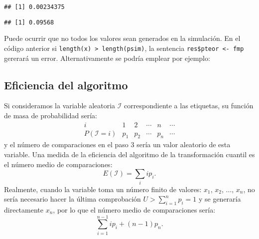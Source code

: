\documentclass[
]{book}
\newenvironment{Shaded}{\begin{snugshade}}{\end{snugshade}}
\newcommand{\DataTypeTok}[1]{\textcolor[rgb]{0.13,0.29,0.53}{#1}}
\newcommand{\DecValTok}[1]{\textcolor[rgb]{0.00,0.00,0.81}{#1}}
\newcommand{\KeywordTok}[1]{\textcolor[rgb]{0.13,0.29,0.53}{\textbf{#1}}}
\newcommand{\NormalTok}[1]{#1}
\newcommand{\OperatorTok}[1]{\textcolor[rgb]{0.81,0.36,0.00}{\textbf{#1}}}
\newcommand{\StringTok}[1]{\textcolor[rgb]{0.31,0.60,0.02}{#1}}
\theoremstyle{break}
\theoremstyle{definition}
\theoremstyle{definition}
\theoremstyle{definition}
\theoremstyle{remark}
\let\BeginKnitrBlock\begin \let\EndKnitrBlock\end
\begin{document}
\begin{verbatim}
## [1] 0.00234375
\end{verbatim}

\begin{Shaded}
\end{Shaded}

\begin{verbatim}
## [1] 0.09568
\end{verbatim}

\BeginKnitrBlock{remark}
\iffalse{} {Nota: } \fi{}Puede ocurrir que no todos los valores sean generados en la simulación.
En el código anterior si \texttt{length(x)\ \textgreater{}\ length(psim)}, la sentencia
\texttt{res\$pteor\ \textless{}-\ fmp} gererará un error. Alternativamente se podría emplear por ejemplo:
\EndKnitrBlock{remark}

\begin{Shaded}
\end{Shaded}

\hypertarget{eficiencia-del-algoritmo-1}{%
\subsection{Eficiencia del algoritmo}\label{eficiencia-del-algoritmo-1}}

Si consideramos la variable aleatoria \(\mathcal{I}\) correspondiente a las etiquetas, su función de masa de probabilidad sería:
\[\begin{array}{l|ccccc}
i & 1 & 2 & \cdots & n & \cdots \\ \hline
P\left( \mathcal{I}=i\right) & p_{1} & p_{2} & \cdots & p_{n} & \cdots 
\end{array}\]
y el número de comparaciones en el paso 3 sería un valor aleatorio de esta variable.
Una medida de la eficiencia del algoritmo de la transformación cuantil es
el número medio de comparaciones:
\[E\left( \mathcal{I}\right) =\sum_i ip_{i}.\]
Realmente, cuando la variable toma un número finito de valores:
\(x_{1}\), \(x_{2}\), \(\ldots\), \(x_{n}\), no sería necesario hacer
la última comprobación \(U>\sum_{i=1}^{n}p_{i}=1\) y se
generaría directamente \(x_{n}\), por lo que el
número medio de comparaciones sería:
\[\sum_{i=1}^{n-1}ip_{i}+\left( n-1\right)  p_{n}.\]
\end{document}
